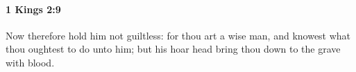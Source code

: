 
		\paragraph{1 Kings 2:9} %
			\label{1KINGS-2-9}

			Now therefore hold him not guiltless: for thou art a wise man, and knowest what thou oughtest to do unto him; but his hoar head bring thou down to the grave with blood.


